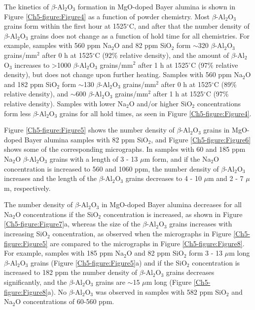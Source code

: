 The kinetics of $\beta$-Al$_{2}$O$_{3}$ formation in MgO-doped Bayer alumina is shown in Figure \ref{Ch5-figure:Figure4} as a function of powder chemistry. Most $\beta$-Al$_{2}$O$_{3}$ grains form within the first hour at 1525$^{\circ}$C, and after that the number density of $\beta$-Al$_{2}$O$_{3}$ grains does not change as a function of hold time for all chemistries. For example, samples with 560 ppm Na$_{2}$O and 82 ppm SiO$_{2}$ form $\sim$320 $\beta$-Al$_{2}$O$_{3}$ grains/mm$^{2}$ after 0 h at 1525$^{\circ}$C (92\% relative density), and the amount of $\beta$-Al$_{2}$O$_{3}$ increases to >1000 $\beta$-Al$_{2}$O$_{3}$ grains/mm$^{2}$ after 1 h at 1525$^{\circ}$C (97\% relative density), but does not change upon further heating. Samples with 560 ppm Na$_{2}$O and 182 ppm SiO$_{2}$ form $\sim$130 $\beta$-Al$_{2}$O$_{3}$ grains/mm$^{2}$ after 0 h at 1525$^{\circ}$C (89\% relative density), and $\sim$600 $\beta$-Al$_{2}$O$_{3}$ grains/mm$^{2}$ after 1 h at 1525$^{\circ}$C (97\% relative density). Samples with lower Na$_{2}$O and/or higher SiO$_{2}$ concentrations form less $\beta$-Al$_{2}$O$_{3}$ grains for all hold times, as seen in Figure \ref{Ch5-figure:Figure4}.

Figure \ref{Ch5-figure:Figure5} shows the number density of $\beta$-Al$_{2}$O$_{3}$ grains in MgO-doped Bayer alumina samples with 82 ppm SiO$_{2}$, and Figure \ref{Ch5-figure:Figure6} shows some of the corresponding micrographs. In samples with 60 and 185 ppm Na$_{2}$O $\beta$-Al$_{2}$O$_{3}$ grains with a length of 3 - 13 $\mu$m form, and if the Na$_{2}$O concentration is increased to 560 and 1060 ppm, the number density of $\beta$-Al$_{2}$O$_{3}$ increases and the length of the $\beta$-Al$_{2}$O$_{3}$ grains decreases to 4 - 10 $\mu$m and 2 - 7 $\mu$m, respectively.

The number density of $\beta$-Al$_{2}$O$_{3}$ in MgO-doped Bayer alumina decreases for all Na$_{2}$O concentrations if the SiO$_{2}$ concentration is increased, as shown in Figure \ref{Ch5-figure:Figure7}a, whereas the size of the $\beta$-Al$_{2}$O$_{3}$ grains increases with increasing SiO$_{2}$ concentration, as observed when the micrographs in Figure \ref{Ch5-figure:Figure5} are compared to the micrographs in Figure \ref{Ch5-figure:Figure8}. For example, samples with 185 ppm Na$_{2}$O and 82 ppm SiO$_{2}$ form 3 - 13 $\mu$m long $\beta$-Al$_{2}$O$_{3}$ grains (Figure \ref{Ch5-figure:Figure5}a) and if the SiO$_{2}$ concentration is increased to 182 ppm the number density of $\beta$-Al$_{2}$O$_{3}$ grains decreases significantly, and the $\beta$-Al$_{2}$O$_{3}$ grains are $\sim$15 $\mu$m long (Figure \ref{Ch5-figure:Figure8}a). No $\beta$-Al$_{2}$O$_{3}$ was observed in samples with 582 ppm SiO$_{2}$ and Na$_{2}$O concentrations of 60-560 ppm.

